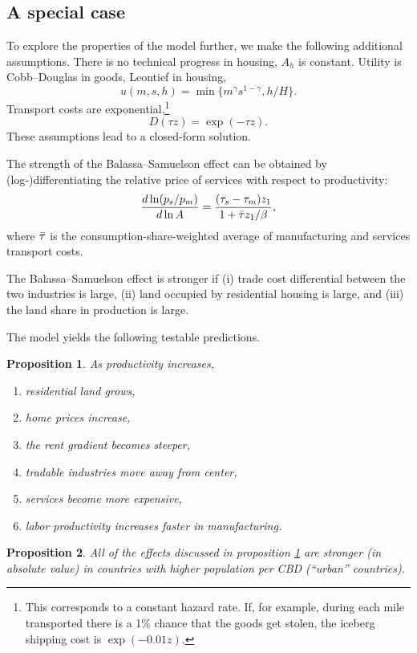 \documentclass[12pt]{article}
\newtheorem{proposition}{Proposition}
\begin{document}
\subsection{A special case}
To explore the properties of the model further, we make the following additional assumptions.
There is no technical progress in housing, $A_h$ is constant. Utility is Cobb--Douglas in goods, Leontief in housing,
\[
u(m,s,h) = \min\{m^\gamma s^{1-\gamma} ,h/H\}.
\]
Transport costs are exponential,\footnote{This corresponds to a constant hazard rate. If, for example, during each mile transported there is a 1\% chance that the goods get stolen, the iceberg shipping cost is $\exp(-0.01 z)$.}
\[
D(\tau z) = \exp(-\tau z).
\]
These assumptions lead to a closed-form solution.

The strength of the Balassa--Samuelson effect can be obtained by (log-)differentiating the relative price of services with respect to productivity:
\begin{equation}\label{eq:bscs}
\frac{d\ln (p_s/p_m)}{d\ln A} = \frac{(\tau_s-\tau_m)z_1}{1+\Bar\tau z_1/\beta},
\end{equation}
where $\Bar\tau$ is the consumption-share-weighted average of manufacturing and services transport costs.

The Balassa--Samuelson effect is stronger if (i) trade cost differential between the two industries is large, (ii) land occupied by residential housing is large, and (iii) the land share in production is large.

The model yields the following testable predictions.
\begin{proposition}\label{prop:compstat}
As productivity increases,
\begin{enumerate}
    \item residential land grows,
    \item home prices increase,
    \item the rent gradient becomes steeper,
    \item tradable industries move away from center,
    \item services become more expensive,
    \item labor productivity increases faster in manufacturing.
\end{enumerate}
\end{proposition}
\begin{proposition}
All of the effects discussed in proposition \ref{prop:compstat} are stronger (in absolute value) in countries with higher population per CBD (``urban'' countries).
\end{proposition}
\end{document}
